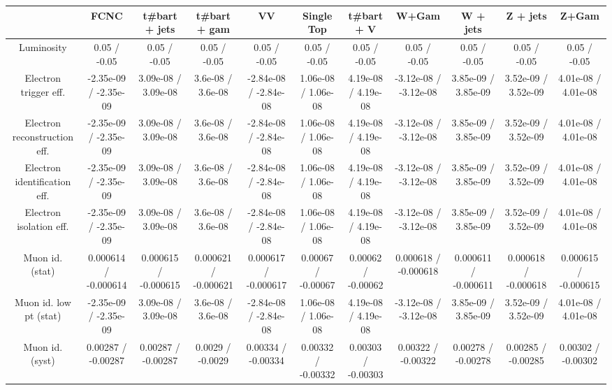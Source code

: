 \begin{table}[htbp]
\begin{center}
\footnotesize
\begin{tabular}{|c|c|c|c|c|c|c|c|c|c|c|}
\hline 
      & FCNC      & t#bar{t} + jets      & t#bar{t} +  gam      & VV      & Single Top      & t#bar{t} + V      & W+Gam      & W + jets      & Z + jets      & Z+Gam \\ 
\hline 
  Luminosity & 0.05 / -0.05 & 0.05 / -0.05 & 0.05 / -0.05 & 0.05 / -0.05 & 0.05 / -0.05 & 0.05 / -0.05 & 0.05 / -0.05 & 0.05 / -0.05 & 0.05 / -0.05 & 0.05 / -0.05 \\ 
  Electron trigger eff. & -2.35e-09 / -2.35e-09 & 3.09e-08 / 3.09e-08 & 3.6e-08 / 3.6e-08 & -2.84e-08 / -2.84e-08 & 1.06e-08 / 1.06e-08 & 4.19e-08 / 4.19e-08 & -3.12e-08 / -3.12e-08 & 3.85e-09 / 3.85e-09 & 3.52e-09 / 3.52e-09 & 4.01e-08 / 4.01e-08 \\ 
  Electron reconstruction eff. & -2.35e-09 / -2.35e-09 & 3.09e-08 / 3.09e-08 & 3.6e-08 / 3.6e-08 & -2.84e-08 / -2.84e-08 & 1.06e-08 / 1.06e-08 & 4.19e-08 / 4.19e-08 & -3.12e-08 / -3.12e-08 & 3.85e-09 / 3.85e-09 & 3.52e-09 / 3.52e-09 & 4.01e-08 / 4.01e-08 \\ 
  Electron identification eff. & -2.35e-09 / -2.35e-09 & 3.09e-08 / 3.09e-08 & 3.6e-08 / 3.6e-08 & -2.84e-08 / -2.84e-08 & 1.06e-08 / 1.06e-08 & 4.19e-08 / 4.19e-08 & -3.12e-08 / -3.12e-08 & 3.85e-09 / 3.85e-09 & 3.52e-09 / 3.52e-09 & 4.01e-08 / 4.01e-08 \\ 
  Electron isolation eff. & -2.35e-09 / -2.35e-09 & 3.09e-08 / 3.09e-08 & 3.6e-08 / 3.6e-08 & -2.84e-08 / -2.84e-08 & 1.06e-08 / 1.06e-08 & 4.19e-08 / 4.19e-08 & -3.12e-08 / -3.12e-08 & 3.85e-09 / 3.85e-09 & 3.52e-09 / 3.52e-09 & 4.01e-08 / 4.01e-08 \\ 
  Muon id. (stat) & 0.000614 / -0.000614 & 0.000615 / -0.000615 & 0.000621 / -0.000621 & 0.000617 / -0.000617 & 0.00067 / -0.00067 & 0.00062 / -0.00062 & 0.000618 / -0.000618 & 0.000611 / -0.000611 & 0.000618 / -0.000618 & 0.000615 / -0.000615 \\ 
  Muon id. low pt (stat) & -2.35e-09 / -2.35e-09 & 3.09e-08 / 3.09e-08 & 3.6e-08 / 3.6e-08 & -2.84e-08 / -2.84e-08 & 1.06e-08 / 1.06e-08 & 4.19e-08 / 4.19e-08 & -3.12e-08 / -3.12e-08 & 3.85e-09 / 3.85e-09 & 3.52e-09 / 3.52e-09 & 4.01e-08 / 4.01e-08 \\ 
  Muon id. (syst) & 0.00287 / -0.00287 & 0.00287 / -0.00287 & 0.0029 / -0.0029 & 0.00334 / -0.00334 & 0.00332 / -0.00332 & 0.00303 / -0.00303 & 0.00322 / -0.00322 & 0.00278 / -0.00278 & 0.00285 / -0.00285 & 0.00302 / -0.00302 \\ 

\end{tabular}
\end{center}
\end{table}
